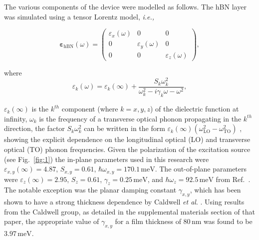 \documentclass[./JimHeneghanDissertation.tex]{subfiles}
\begin{document}
			The various components of the device were modelled as follows. The hBN layer was simulated using a tensor Lorentz model, \textit{i.e.,}

			\begin{equation}
			  \bm{\varepsilon}_\mathrm{hBN}(\omega) = \begin{pmatrix} \varepsilon_{x}(\omega) & 0                       & 0                       \\
			    0                       & \varepsilon_{y}(\omega) & 0                       \\
			    0                       & 0                       & \varepsilon_{z}(\omega)\end{pmatrix},
			\end{equation}

			\noindent where
			\begin{equation}
			  \varepsilon_{k}(\omega) = \varepsilon_{k}(\infty) + \frac{S_{k} \omega_{k}^{2}}{\omega_{k}^{2} - i\gamma_{k}\omega - \omega^{2}},
			\end{equation}

			\noindent $\varepsilon_{k}(\infty)$ is the $k^{th}$ component (where $k=x,y,z$) of the dielectric function at infinity, $\omega_{k}$ is the frequency of a transverse optical phonon propagating in the $k^{th}$ direction, the factor $S_{k} \omega_{k}^{2}$ can be written in the form $\varepsilon_{k}(\infty)(\omega_\mathrm{LO}^2 - \omega_\mathrm{TO}^2) $  \cite{Kumar:15}, showing the explicit dependence on the longitudinal optical (LO) and transverse optical (TO) phonon frequencies. Given the polarization of the excitation source (see Fig.~\ref{fig:1}) the in-plane parameters used in this research were $\varepsilon_{x,y}(\infty) = 4.87$, $S_{x,y} = 0.61$, $\hbar\omega_{x,y} =  170.1 \, \si{\milli\eV}$. The out-of-plane parameters were  $\varepsilon_{z}(\infty)= 2.95$, $S_z = 0.61$,  $\gamma_z =  0.25\, \si{\milli\eV}$, and $\hbar \omega_{z} =  92.5 \, \si{\milli\eV}$ from Ref.~\cite{Jiang:18}. The notable exception was the planar damping constant $\gamma_{x,y}$, which has been shown to have a strong thickness dependence by Caldwell \textit{et al}. \cite{Caldwell:14}. Using results from the Caldwell group, as detailed in the supplemental materials section of that paper, the appropriate value of $\gamma_{x,y}$ for a film thickness of $80\, \si{\nm}$ was found to be $3.97\, \si{\milli\eV}$.
\end{document}
